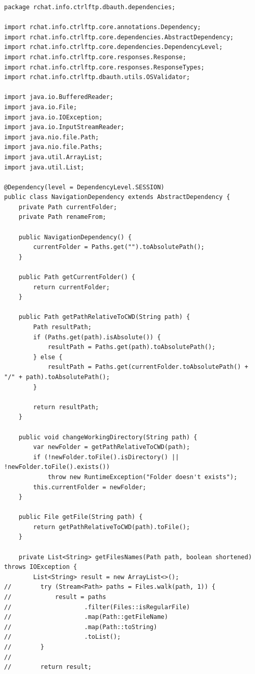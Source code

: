 \documentclass[a4paper,14pt]{extarticle}
\begin{document}
\begin{verbatim}
package rchat.info.ctrlftp.dbauth.dependencies;

import rchat.info.ctrlftp.core.annotations.Dependency;
import rchat.info.ctrlftp.core.dependencies.AbstractDependency;
import rchat.info.ctrlftp.core.dependencies.DependencyLevel;
import rchat.info.ctrlftp.core.responses.Response;
import rchat.info.ctrlftp.core.responses.ResponseTypes;
import rchat.info.ctrlftp.dbauth.utils.OSValidator;

import java.io.BufferedReader;
import java.io.File;
import java.io.IOException;
import java.io.InputStreamReader;
import java.nio.file.Path;
import java.nio.file.Paths;
import java.util.ArrayList;
import java.util.List;

@Dependency(level = DependencyLevel.SESSION)
public class NavigationDependency extends AbstractDependency {
    private Path currentFolder;
    private Path renameFrom;

    public NavigationDependency() {
        currentFolder = Paths.get("").toAbsolutePath();
    }

    public Path getCurrentFolder() {
        return currentFolder;
    }

    public Path getPathRelativeToCWD(String path) {
        Path resultPath;
        if (Paths.get(path).isAbsolute()) {
            resultPath = Paths.get(path).toAbsolutePath();
        } else {
            resultPath = Paths.get(currentFolder.toAbsolutePath() + "/" + path).toAbsolutePath();
        }

        return resultPath;
    }

    public void changeWorkingDirectory(String path) {
        var newFolder = getPathRelativeToCWD(path);
        if (!newFolder.toFile().isDirectory() || !newFolder.toFile().exists())
            throw new RuntimeException("Folder doesn't exists");
        this.currentFolder = newFolder;
    }
    
    public File getFile(String path) {
        return getPathRelativeToCWD(path).toFile();
    }

    private List<String> getFilesNames(Path path, boolean shortened) throws IOException {
        List<String> result = new ArrayList<>();
//        try (Stream<Path> paths = Files.walk(path, 1)) {
//            result = paths
//                    .filter(Files::isRegularFile)
//                    .map(Path::getFileName)
//                    .map(Path::toString)
//                    .toList();
//        }
//
//        return result;


\end{verbatim}
\end{document}
